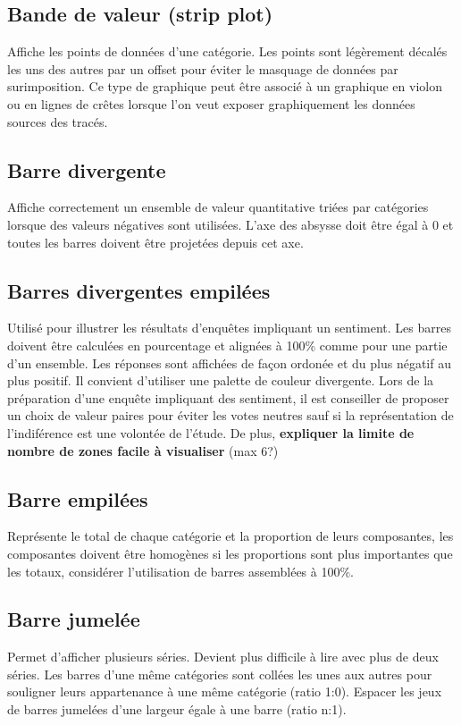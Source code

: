 \documentclass[a4paper,12pt]{article}
\begin{document}
\begin{multicols}{2}
\subsection*{Bande de valeur (strip plot)}
\label{sec:orgd91a87b}
Affiche les points de données d'une catégorie. Les points sont légèrement décalés les uns des autres par un offset pour éviter le masquage de données par surimposition. Ce type de graphique peut être associé à un graphique en violon ou en lignes de crêtes lorsque l'on veut exposer graphiquement les données sources des tracés. \autocite{wilkeVisualizingManyDistributions2019}
\subsection*{Barre divergente}
\label{sec:org00d3920}
Affiche correctement un ensemble de valeur quantitative triées par catégories lorsque des valeurs négatives sont utilisées. \autocite{alansmithLexiqueVisuel} L'axe des absysse doit être égal à 0 et toutes les barres doivent être projetées depuis cet axe.
\subsection*{Barres divergentes empilées}
\label{sec:orgee27c88}
Utilisé pour illustrer les résultats d'enquêtes impliquant un sentiment. \autocite{alansmithLexiqueVisuel} Les barres doivent être calculées en pourcentage et alignées à 100\% comme pour une partie d'un ensemble. Les réponses sont affichées de façon ordonée et du plus négatif au plus positif. Il convient d'utiliser une palette de couleur divergente. Lors de la préparation d'une enquête impliquant des sentiment, il est conseiller de proposer un choix de valeur paires pour éviter les votes neutres sauf si la représentation de l'indiférence est une volontée de l'étude. De plus, \textbf{expliquer la limite de nombre de zones facile à visualiser} (max 6?)
\subsection*{Barre empilées}
\label{sec:org92f23c3}
Représente le total de chaque catégorie et la proportion de leurs composantes, les composantes doivent être homogènes si les proportions sont plus importantes que les totaux, considérer l'utilisation de barres assemblées à 100\%. \autocite{mikeyiHowChooseRight2020}
\subsection*{Barre jumelée}
\label{sec:orge6570ba}
Permet d'afficher plusieurs séries. Devient plus difficile à lire avec plus de deux séries. \autocite{alansmithLexiqueVisuel}
Les barres d'une même catégories sont collées les unes aux autres pour souligner leurs appartenance à une même catégorie (ratio 1:0). Espacer les jeux de barres jumelées d'une largeur égale à une barre (ratio n:1).


\end{multicols}
\end{document}
